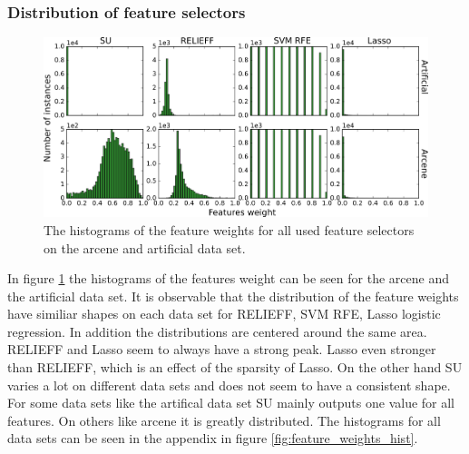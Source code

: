 \documentclass[twoside,11pt]{article}
\begin{document}
\subsubsection{Distribution of feature selectors}
\begin{figure}[h!]
  \centering
    \includegraphics[width=\textwidth]{feature_weights_hist_arcene_artificial.png}
  \caption{The histograms of the feature weights for all used feature selectors on the arcene and artificial data set.}
  \label{fig:feature_weights_hist_arcene_artificial}
\end{figure}
In figure \ref{fig:feature_weights_hist_arcene_artificial} the histograms of the features weight can be seen for the arcene and the artificial data set. It is observable that the distribution of the feature weights have similiar shapes on each data set for RELIEFF, SVM RFE, Lasso logistic regression. In addition the distributions are centered around the same area. RELIEFF and Lasso seem to always have a strong peak. Lasso even stronger than RELIEFF, which is an effect of the sparsity of Lasso. On the other hand SU varies a lot on different data sets and does not seem to have a consistent shape. For some data sets like the artifical data set SU mainly outputs one value for all features. On others like arcene it is greatly distributed. The histograms for all data sets can be seen in the appendix in figure \ref{fig:feature_weights_hist}.
\end{document}
